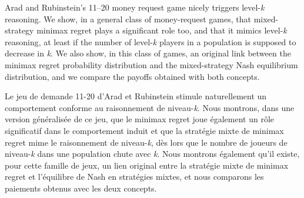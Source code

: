 \begin{Article}[Auteur={Gisèle Umbhauer\thanks{BETA, University of Strasbourg. \emph{Correspondence:} 61 Avenue de la Forêt Noire, 67085 Strasbourg Cedex, France. \emph{E-mail:}\href{mailto:umbhauer@unistra.fr}{\nolinkurl{umbhauer@unistra.fr}}}}, Titre={Minimax Regret in the 11-20 Money Request Game}]


\begin{refsection}[Umbhauer]

\begin{resumeENG}
Arad and Rubinstein's 11--20 money request game nicely triggers
level-\emph{k} reasoning. We show, in a general class of money-request games, that mixed-strategy minimax regret plays a significant role too, and that it mimics level-\emph{k} reasoning, at least if the number of level-\emph{k} players in a population is supposed to decrease in \emph{k}. We also show, in this class of games, an original link between the minimax regret probability distribution and the mixed-strategy Nash equilibrium distribution, and we compare the payoffs obtained with both concepts.
\end{resumeENG}


\begin{resume}
Le jeu de demande 11-20 d'Arad et Rubinstein stimule naturellement un comportement conforme au raisonnement de niveau-\emph{k}. Nous montrons, dans une version généralisée de ce jeu, que le minimax regret joue également un rôle significatif dans le comportement induit et que la stratégie mixte de minimax regret mime le raisonnement de niveau-\emph{k}, dès lors que le nombre de joueurs de niveau-\emph{k} dans une population chute avec \emph{k}. Nous montrons également qu'il existe, pour cette famille de jeux, un lien original entre la stratégie mixte de minimax regret et l'équilibre de Nash en stratégies mixtes, et nous comparons les paiements obtenus avec les deux concepts.
\end{resume}



\end{refsection}
\end{Article}
